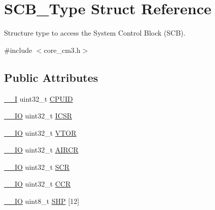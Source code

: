 \hypertarget{struct_s_c_b___type}{\section{\-S\-C\-B\-\_\-\-Type \-Struct \-Reference}
\label{struct_s_c_b___type}
}


\-Structure type to access the \-System \-Control \-Block (\-S\-C\-B).  




{\ttfamily \#include $<$core\-\_\-cm3.\-h$>$}

\subsection*{\-Public \-Attributes}
\begin{DoxyCompactItemize}
\item 
\hyperlink{group___c_m_s_i_s__core__definitions_gaf63697ed9952cc71e1225efe205f6cd3}{\-\_\-\-\_\-\-I} uint32\-\_\-t \hyperlink{struct_s_c_b___type_afa7a9ee34dfa1da0b60b4525da285032}{\-C\-P\-U\-I\-D}
\item 
\hyperlink{group___c_m_s_i_s__core__definitions_gaec43007d9998a0a0e01faede4133d6be}{\-\_\-\-\_\-\-I\-O} uint32\-\_\-t \hyperlink{struct_s_c_b___type_a3e66570ab689d28aebefa7e84e85dc4a}{\-I\-C\-S\-R}
\item 
\hyperlink{group___c_m_s_i_s__core__definitions_gaec43007d9998a0a0e01faede4133d6be}{\-\_\-\-\_\-\-I\-O} uint32\-\_\-t \hyperlink{struct_s_c_b___type_a0faf96f964931cadfb71cfa54e051f6f}{\-V\-T\-O\-R}
\item 
\hyperlink{group___c_m_s_i_s__core__definitions_gaec43007d9998a0a0e01faede4133d6be}{\-\_\-\-\_\-\-I\-O} uint32\-\_\-t \hyperlink{struct_s_c_b___type_a6ed3c9064013343ea9fd0a73a734f29d}{\-A\-I\-R\-C\-R}
\item 
\hyperlink{group___c_m_s_i_s__core__definitions_gaec43007d9998a0a0e01faede4133d6be}{\-\_\-\-\_\-\-I\-O} uint32\-\_\-t \hyperlink{struct_s_c_b___type_abfad14e7b4534d73d329819625d77a16}{\-S\-C\-R}
\item 
\hyperlink{group___c_m_s_i_s__core__definitions_gaec43007d9998a0a0e01faede4133d6be}{\-\_\-\-\_\-\-I\-O} uint32\-\_\-t \hyperlink{struct_s_c_b___type_a6d273c6b90bad15c91dfbbad0f6e92d8}{\-C\-C\-R}
\item 
\hyperlink{group___c_m_s_i_s__core__definitions_gaec43007d9998a0a0e01faede4133d6be}{\-\_\-\-\_\-\-I\-O} uint8\-\_\-t \hyperlink{struct_s_c_b___type_af6336103f8be0cab29de51daed5a65f4}{\-S\-H\-P} \mbox{[}12\mbox{]}

\end{DoxyCompactItemize}
